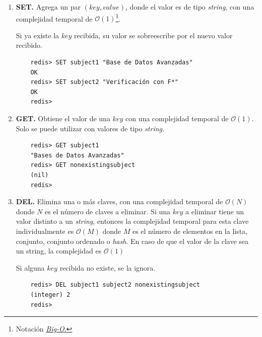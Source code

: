 \documentclass[pdflatex,sn-mathphys-num]{sn-jnl}
\theoremstyle{thmstyleone}%
\theoremstyle{thmstyletwo}%
\theoremstyle{thmstylethree}%
\begin{document}
\begin{enumerate}
    \item \textbf{SET.} Agrega un par $(key, value)$, donde el valor es de tipo \textit{string}, con una complejidad temporal de $\mathcal{O}(1)$\footnote{Notación \href{https://en.wikipedia.org/wiki/Big_O_notation}{\textit{Big-O}.}}. 
    
    Si ya existe la $key$ recibida, su valor se sobreescribe por el nuevo valor recibido.

    \begin{verbatim}
    redis> SET subject1 "Base de Datos Avanzadas"
    OK
    redis> SET subject2 "Verificación con F*"
    OK
    redis>
    \end{verbatim}

    \vspace{-0.5cm}
    
    \item \textbf{GET.} Obtiene el valor de una $key$ con una complejidad temporal de $\mathcal{O}(1)$. Solo se puede utilizar con valores de tipo \textit{string}.

    \begin{verbatim}
    redis> GET subject1
    "Bases de Datos Avanzadas"
    redis> GET nonexistingsubject
    (nil)
    redis>
    \end{verbatim}

    \vspace{-0.5cm}
    
    \item \textbf{DEL.} Elimina una o más claves, con una complejidad temporal de $\mathcal{O}(N)$ donde $N$ es el número de claves a eliminar. Si una $key$ a eliminar tiene un valor distinto a un \textit{string}, entonces la complejidad temporal para esta clave individualmente es $\mathcal{O}(M)$ donde $M$ es el número de elementos en la lista, conjunto, conjunto ordenado o \textit{hash}. En caso de que el valor de la clave sea un string, la complejidad es $\mathcal{O}(1)$

    Si alguna $key$ recibida no existe, se la ignora.

    \begin{verbatim}
    redis> DEL subject1 subject2 nonexistingsubject
    (integer) 2
    redis>
    \end{verbatim}

    \vspace{-0.5cm}
    


\end{enumerate}
\end{document}
